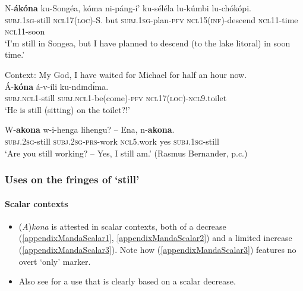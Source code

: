 \begin{exe}
	\ex
	\gll N-\textbf{ákóna} ku-Songéa, kóma ni-páng-í' ku-séléla lu-kúmbi lu-chókópi.\\
	\textsc{subj}.1\textsc{sg}-still \textsc{ncl}17(\textsc{loc})-S. but \textsc{subj}.1\textsc{sg}-plan-\textsc{pfv} \textsc{ncl}15(\textsc{inf})-descend \textsc{ncl}11-time \textsc{ncl}11-soon\\
	\glt \lq I’m still in Songea, but I have planned to descend (to the lake litoral) in soon time.' \parencite[261]{Bernander2017}

	\ex\label{exAppendixManda2}
	Context:  My God, I have waited for Michael for half an hour now.\\
	\gll Á-\textbf{kóna} á-v-íli ku-ndɪndɪ́ma.\\
	\textsc{subj}.\textsc{ncl}1-still \textsc{subj}.\textsc{ncl}1-be(come)-\textsc{pfv} \textsc{ncl}17(\textsc{loc})-\textsc{ncl}9.toilet\\
	\glt \lq He is still (sitting) on the toilet?!\rq{ }\parencite[54]{Bernander2021}
	
	\ex\label{exAppendixManda3}
	\gll W-\textbf{akona} w-i-henga lihengu? – Ena, n-\textbf{akona}.\\
	\textsc{subj}.2\textsc{sg}-still \textsc{subj}.2\textsc{sg}-\textsc{prs}-work \textsc{ncl5}.work {} yes \textsc{subj}.1\textsc{sg}-still\\
	\glt \lq Are you still working? -- Yes, I still am.' (Rasmus Bernander, p.c.)
\end{exe}

\subsubsection{Uses on the fringes of \lq still\rq{}}

\paragraph{Scalar contexts}\label{appendixMandaScalar}
\begin{itemize}
	\item \mbox{(\textit{A})\textit{kona}} is attested in scalar contexts, both of a decrease (\ref{appendixMandaScalar1}, \ref{appendixMandaScalar2}) and a limited increase (\ref{appendixMandaScalar3}). Note how (\ref{appendixMandaScalar3}) features no overt \lq only\rq{ }marker.
	\item Also see  for a use that is clearly based on a scalar decrease.
\end{itemize}

